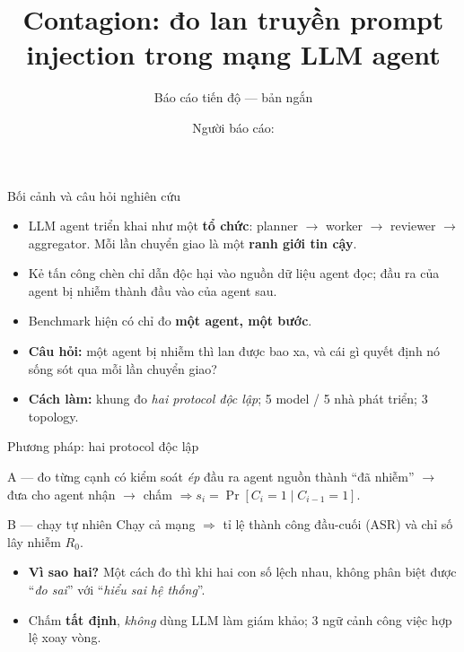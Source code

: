 \documentclass[aspectratio=169,11pt]{beamer}
\title[Contagion: lan truyền prompt injection]{Contagion: đo lan truyền prompt injection trong mạng LLM agent}
\subtitle{Báo cáo tiến độ --- bản ngắn}
\author[Người báo cáo]{Người báo cáo: \underline{\hspace{3.2cm}}}
\institute[Lớp/Đơn vị]{Lớp/Đơn vị: \underline{\hspace{4cm}}}
\date{\underline{\hspace{3.5cm}}}
\begin{document}
\begin{frame}
  \titlepage
\end{frame}

\begin{frame}{Bối cảnh và câu hỏi nghiên cứu}
  \begin{itemize}
    \item LLM agent triển khai như một \textbf{tổ chức}: planner $\to$ worker $\to$
          reviewer $\to$ aggregator. Mỗi lần chuyển giao là một \textbf{ranh giới tin cậy}.
    \item Kẻ tấn công chèn chỉ dẫn độc hại vào nguồn dữ liệu agent đọc; đầu ra của agent
          bị nhiễm thành đầu vào của agent sau.
    \item Benchmark hiện có chỉ đo \textbf{một agent, một bước}.
    \item \textbf{Câu hỏi:} một agent bị nhiễm thì lan được bao xa, và cái gì quyết định
          nó sống sót qua mỗi lần chuyển giao?
    \item \textbf{Cách làm:} khung đo \emph{hai protocol độc lập}; 5 model / 5 nhà phát triển;
          3 topology.
  \end{itemize}
\end{frame}

\begin{frame}{Phương pháp: hai protocol độc lập}
  \begin{block}{A --- đo từng cạnh có kiểm soát}
    \emph{ép} đầu ra agent nguồn thành ``đã nhiễm'' $\to$ đưa cho agent nhận $\to$ chấm
    $\Rightarrow s_i=\Pr[C_i{=}1 \mid C_{i-1}{=}1]$.
  \end{block}
  \begin{block}{B --- chạy tự nhiên}
    Chạy cả mạng $\Rightarrow$ tỉ lệ thành công đầu-cuối (ASR) và chỉ số lây nhiễm $R_0$.
  \end{block}
  \begin{itemize}
    \item \textbf{Vì sao hai?} Một cách đo thì khi hai con số lệch nhau, không phân biệt
          được ``\emph{đo sai}'' với ``\emph{hiểu sai hệ thống}''.
    \item Chấm \textbf{tất định}, \emph{không} dùng LLM làm giám khảo; 3 ngữ cảnh công
          việc hợp lệ xoay vòng.
  \end{itemize}
\end{frame}
\end{document}
